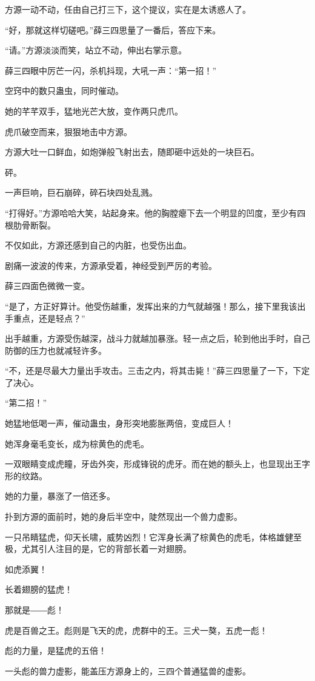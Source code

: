\begin{this_body}
方源一动不动，任由自己打三下，这个提议，实在是太诱惑人了。

“好，那就这样切磋吧。”薛三四思量了一番后，答应下来。

“请。”方源淡淡而笑，站立不动，伸出右掌示意。

薛三四眼中厉芒一闪，杀机抖现，大吼一声：“第一招！”

空窍中的数只蛊虫，同时催动。

她的芊芊双手，猛地光芒大放，变作两只虎爪。

虎爪破空而来，狠狠地击中方源。

方源大吐一口鲜血，如炮弹般飞射出去，随即砸中远处的一块巨石。

砰。

一声巨响，巨石崩碎，碎石块四处乱溅。

“打得好。”方源哈哈大笑，站起身来。他的胸膛瘪下去一个明显的凹度，至少有四根肋骨断裂。

不仅如此，方源还感到自己的内脏，也受伤出血。

剧痛一波波的传来，方源承受着，神经受到严厉的考验。

薛三四面色微微一变。

“是了，方正好算计。他受伤越重，发挥出来的力气就越强！那么，接下里我该出手重点，还是轻点？”

出手越重，方源受伤越深，战斗力就越加暴涨。轻一点之后，轮到他出手时，自己防御的压力也就减轻许多。

“不，还是尽最大力量出手攻击。三击之内，将其击毙！”薛三四思量了一下，下定了决心。

“第二招！”

她猛地低喝一声，催动蛊虫，身形突地膨胀两倍，变成巨人！

她浑身毫毛变长，成为棕黄色的虎毛。

一双眼睛变成虎瞳，牙齿外突，形成锋锐的虎牙。而在她的额头上，也显现出王字形的纹路。

她的力量，暴涨了一倍还多。

扑到方源的面前时，她的身后半空中，陡然现出一个兽力虚影。

一只吊睛猛虎，仰天长啸，威势凶烈！它浑身长满了棕黄色的虎毛，体格雄健至极，尤其引人注目的是，它的背部长着一对翅膀。

如虎添翼！

长着翅膀的猛虎！

那就是――彪！

虎是百兽之王。彪则是飞天的虎，虎群中的王。三犬一獒，五虎一彪！

彪的力量，是猛虎的五倍！

一头彪的兽力虚影，能盖压方源身上的，三四个普通猛兽的虚影。


\end{this_body}
